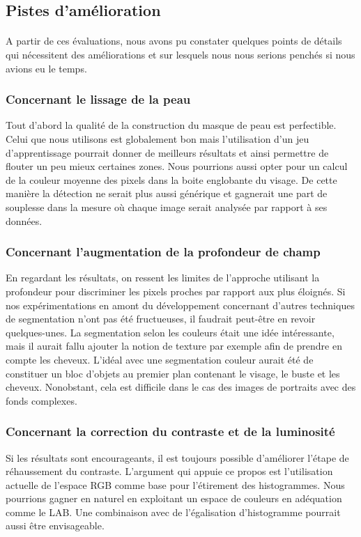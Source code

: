 \documentclass[11pt, french]{report-rd-info}
\begin{document}
\subsection{Pistes d'amélioration}
\paragraph*{}
A partir de ces évaluations, nous avons pu constater quelques points de détails qui nécessitent des améliorations et sur lesquels nous nous serions penchés si nous avions eu le temps.

\subsubsection{Concernant le lissage de la peau}
Tout d’abord la qualité de la construction du masque de peau est perfectible. Celui que nous utilisons est globalement bon mais l’utilisation d’un jeu d’apprentissage pourrait donner de meilleurs résultats et ainsi permettre de flouter un peu mieux certaines zones. Nous pourrions aussi opter pour un calcul de la couleur moyenne des pixels dans la boite englobante du visage. De cette manière la détection ne serait plus aussi générique et gagnerait une part de 
souplesse dans la mesure où chaque image serait analysée par rapport à ses données.

\subsubsection{Concernant l'augmentation de la profondeur de champ}
En regardant les résultats, on ressent les limites de l'approche utilisant la profondeur pour discriminer les pixels proches par rapport aux plus éloignés. Si nos expérimentations en amont du développement concernant d'autres techniques de segmentation n'ont pas été fructueuses, il faudrait peut-être en revoir quelques-unes. La segmentation selon les couleurs était une idée intéressante, mais il aurait fallu ajouter la notion de texture par exemple afin de prendre en compte les cheveux. L'idéal avec une segmentation couleur aurait été de constituer un bloc d'objets au premier plan contenant le visage, le buste et les cheveux. Nonobstant, cela est difficile dans le cas des images de portraits avec des fonds complexes. 

\subsubsection{Concernant la correction du contraste et de la luminosité}
Si les résultats sont encourageants, il est toujours possible d'améliorer l'étape de réhaussement du contraste. L'argument qui appuie ce propos est l'utilisation actuelle de l'espace RGB comme base pour l'étirement des histogrammes. Nous pourrions gagner en naturel en exploitant un espace de couleurs en adéquation comme le LAB. Une combinaison avec de l'égalisation d'histogramme pourrait aussi être envisageable.
\end{document}
